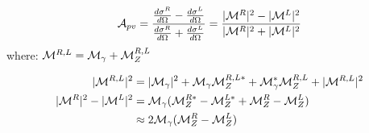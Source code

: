 \begin{equation*}
    \mathcal{A}_{pv} = \frac{\frac{d\sigma^R}{d\Omega} - \frac{d\sigma^L}{d\Omega}}{\frac{d\sigma^R}{d\Omega} + \frac{d\sigma^L}{d\Omega}} = \frac{|\mathcal{M}^R|^2 - |\mathcal{M}^L|^2}{|\mathcal{M}^R|^2 + |\mathcal{M}^L|^2}
\end{equation*}
where: $\mathcal{M}^{R, L} = \mathcal{M}_{\gamma} + \mathcal{M}_Z^{R,L}$

\begin{equation*}
    \begin{aligned}
	|\mathcal{M}^{R,L}|^2 &= |\mathcal{M}_\gamma|^2 + \mathcal{M}_\gamma\mathcal{M}_Z^{R,L*} + \mathcal{M}_\gamma^*\mathcal{M}_Z^{R,L} + |\mathcal{M}^{R,L}|^2	\\
	|\mathcal{M}^{R}|^2 - |\mathcal{M}^{L}|^2 &= \mathcal{M}_\gamma( \mathcal{M}_Z^{R*} - \mathcal{M}_Z^{L*} + \mathcal{M}_Z^{R} - \mathcal{M}_Z^L) \\
	&\approx 2\mathcal{M}_\gamma(\mathcal{M}_Z^R - \mathcal{M}_Z^L)
    \end{aligned}
\end{equation*}


